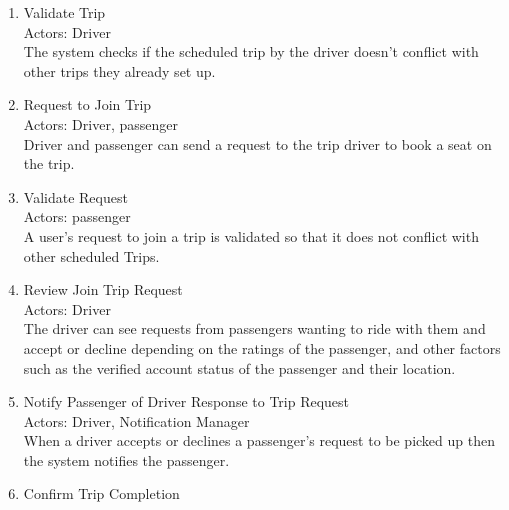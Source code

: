 \documentclass[a4paper, 12pt]{report} %
\begin{document}
\begin{enumerate}
                \item Validate Trip \\
                    Actors: Driver \\
                    The system checks if the scheduled trip by the driver doesn't conflict with other trips they already set up. 
                \item Request to Join Trip \\
                    Actors: Driver, passenger \\
                    Driver and passenger can send a request to the trip driver to book a seat on the trip.
                \item Validate Request \\
                    Actors: passenger \\ 
                    A user’s request to join a trip is validated so that it does not conflict with other scheduled Trips.
                \item Review Join Trip Request \\
                    Actors: Driver \\
                    The driver can see requests from passengers wanting to ride with them and accept or decline depending on the ratings of the passenger, and other factors such as the verified account status of the passenger and their location. 
                \item Notify Passenger of Driver Response to Trip Request\\
                    Actors: Driver, Notification Manager\\
                    When a driver accepts or declines a passenger’s request to be picked up then the system notifies the passenger.
                \item Confirm Trip Completion\\

\end{enumerate}
\end{document}
